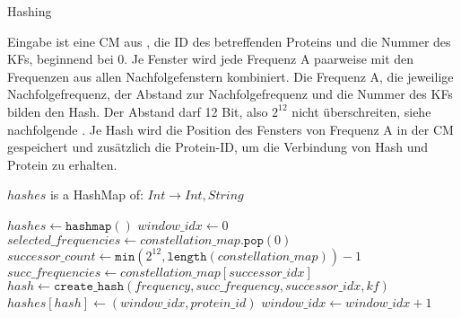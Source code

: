         \begin{algorithm}[H]
            \caption{Hashing}\label{alg:hashing}
            Eingabe ist eine \acl{CM} aus , die ID des betreffenden Proteins und die Nummer des \acl{KF}s, beginnend bei 0. Je Fenster wird jede Frequenz A paarweise mit den Frequenzen aus allen Nachfolgefenstern kombiniert. Die Frequenz A, die jeweilige Nachfolgefrequenz, der Abstand zur Nachfolgefrequenz und die Nummer des \acl{KF}s bilden den Hash. Der Abstand darf 12 Bit, also $2^{12}$ nicht überschreiten, siehe nachfolgende \label{fig:hash}. Je Hash wird die Position des Fensters von Frequenz A in der \acl{CM} gespeichert und zusätzlich die Protein-ID, um die Verbindung von Hash und Protein zu erhalten.
            \begin{algorithmic}[1]
                \Ensure $hashes$ is a HashMap of: $Int \rightarrow Int, String$

                \State $hashes \gets \texttt{hashmap}()$
                \State $window\_idx \gets 0$
                \Repeat
                    \State $selected\_frequencies \gets constellation\_map.\texttt{pop}(0)$
                        \State $successor\_count \gets \texttt{min}(2^{12}, \texttt{length}(constellation\_map)) - 1$
                            \State $succ\_frequencies \gets constellation\_map[successor\_idx]$
                                \State $hash \gets \texttt{create\_hash}(frequency, succ\_frequency, successor\_idx, kf)$
                                \State $hashes[hash] \gets (window\_idx, protein\_id)$
                            \EndFor
                        \EndFor
                    \EndFor
                    \State $window\_idx \gets window\_idx + 1$
            \end{algorithmic}
        \end{algorithm}

